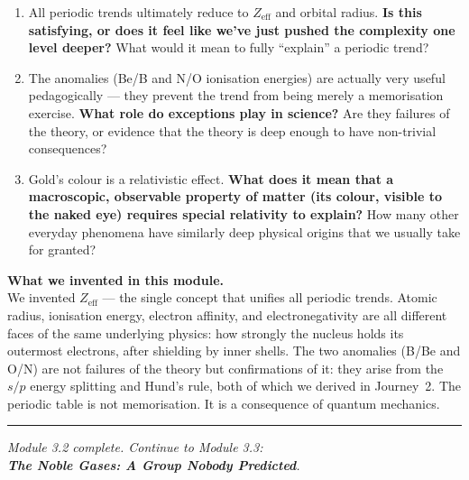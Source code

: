 \documentclass[12pt, a4paper]{book}
\begin{document}
\begin{reflectionbox}
\begin{enumerate}[label=\textbf{R\arabic*.}]
  \item All periodic trends ultimately reduce to
        $Z_\text{eff}$ and orbital radius.
        \textbf{Is this satisfying, or does it feel like
        we've just pushed the complexity one level deeper?}
        What would it mean to fully ``explain'' a periodic trend?

  \item The anomalies (Be/B and N/O ionisation energies)
        are actually very useful pedagogically ---
        they prevent the trend from being merely a
        memorisation exercise.
        \textbf{What role do exceptions play in science?}
        Are they failures of the theory,
        or evidence that the theory is deep enough to have
        non-trivial consequences?

  \item Gold's colour is a relativistic effect.
        \textbf{What does it mean that a macroscopic, observable
        property of matter (its colour, visible to the naked eye)
        requires special relativity to explain?}
        How many other everyday phenomena have similarly
        deep physical origins that we usually take for granted?
\end{enumerate}
\end{reflectionbox}

\vspace{1.5em}
\begin{center}
\begin{tcolorbox}[enhanced, colback=DiscoveryColor!8, colframe=DiscoveryColor,
  width=0.88\textwidth, arc=3pt]
\centering\sffamily\small
\textbf{What we invented in this module.}\\[4pt]
We invented $Z_\text{eff}$ --- the single concept that unifies
all periodic trends.
Atomic radius, ionisation energy, electron affinity, and
electronegativity are all different faces of the same
underlying physics: how strongly the nucleus holds its
outermost electrons, after shielding by inner shells.
The two anomalies (B/Be and O/N) are not failures of the theory
but confirmations of it: they arise from the $s/p$ energy
splitting and Hund's rule, both of which we derived in Journey~2.
The periodic table is not memorisation.
It is a consequence of quantum mechanics.
\end{tcolorbox}
\end{center}

\vspace{2em}
\noindent\textcolor{JourneyColor!40}{\rule{\textwidth}{0.6pt}}
\begin{center}
\textit{\sffamily\small
Module 3.2 complete. Continue to Module 3.3:\\
\textbf{The Noble Gases: A Group Nobody Predicted}.}
\end{center}
\end{document}
